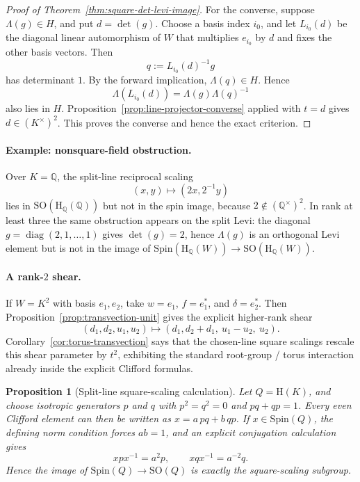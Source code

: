 \documentclass{birkjour}
\theoremstyle{plain}
\newtheorem{proposition}[theorem]{Proposition}
\theoremstyle{definition}
\theoremstyle{remark}
\numberwithin{equation}{section}
\newcommand{\Spin}{\mathrm{Spin}}
\newcommand{\SO}{\mathrm{SO}}
\newcommand{\Hyp}{\mathrm{H}}
\begin{document}
\begin{proof}[Proof of Theorem~\ref{thm:square-det-levi-image}]
For the converse, suppose \(\Lambda(g)\in H\), and put
\(d=\det(g)\). Choose a basis index \(i_0\), and let \(L_{i_0}(d)\) be the
diagonal linear automorphism of \(W\) that multiplies \(e_{i_0}\) by \(d\) and
fixes the other basis vectors. Then
\[
  q:=L_{i_0}(d)^{-1}g
\]
has determinant \(1\). By the forward implication,
\(\Lambda(q)\in H\). Hence
\[
  \Lambda(L_{i_0}(d))
    =\Lambda(g)\Lambda(q)^{-1}
\]
also lies in \(H\). Proposition~\ref{prop:line-projector-converse} applied with
\(t=d\) gives \(d\in(K^\times)^2\). This proves the converse and hence the exact
criterion.
\end{proof}

\paragraph{Example: nonsquare-field obstruction.}
Over \(K=\mathbb{Q}\), the split-line reciprocal scaling
\[
  (x,y)\longmapsto (2x,2^{-1}y)
\]
lies in \(\SO(\Hyp_{\mathbb{Q}}(\mathbb{Q}))\) but not in the spin image,
because \(2\notin(\mathbb{Q}^\times)^2\). In rank at least three the same
obstruction appears on the split Levi: the diagonal \(g=\operatorname{diag}
(2,1,\ldots,1)\) gives \(\det(g)=2\), hence \(\Lambda(g)\) is an orthogonal
Levi element but is not in the image of
\(\Spin(\Hyp_{\mathbb{Q}}(W))\to\SO(\Hyp_{\mathbb{Q}}(W))\).

\paragraph{A rank-$2$ shear.}
If $W=K^2$ with basis $e_1,e_2$, take $w=e_1$, $f=e_1^*$, and
$\delta=e_2^*$. Then Proposition~\ref{prop:transvection-unit} gives the
explicit higher-rank shear
\[
  (d_1,d_2,u_1,u_2)\longmapsto (d_1,d_2+d_1,\ u_1-u_2,\ u_2).
\]
Corollary~\ref{cor:torus-transvection} says that the chosen-line square
scalings rescale this shear parameter by $t^2$, exhibiting the standard
root-group / torus interaction already inside the explicit Clifford formulas.

\begin{proposition}[Split-line square-scaling calculation]
\label{prop:split-line-square}
Let $Q=\Hyp(K)$, and choose isotropic generators $p$ and $q$ with
\(p^2=q^2=0\) and \(pq+qp=1\). Every even Clifford element can then be written
as \(x=a\,pq+b\,qp\). If \(x\in \Spin(Q)\), the defining norm condition forces
\(ab=1\), and an explicit conjugation calculation gives
\[
  x p x^{-1}=a^2 p,
  \qquad
  x q x^{-1}=a^{-2} q.
\]
Hence the image of $\Spin(Q)\to \SO(Q)$ is exactly the square-scaling subgroup.
\end{proposition}
\end{document}
